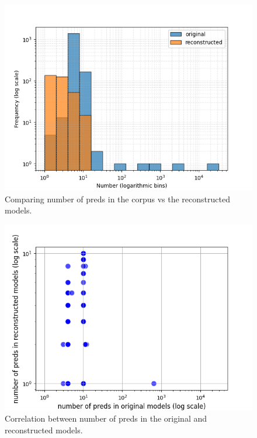 \begin{figure}[htbp]
\centerline{\includegraphics[width=\linewidth]{"./Comparing number of preds in the corpus vs the reconstructed models.png"}}
\caption{Comparing number of preds in the corpus vs the reconstructed models.}
\label{fig}
\end{figure}


\begin{figure}[htbp]
\centerline{\includegraphics[width=\linewidth]{"./Correlation between number of preds in the original and reconstructed models.png"}}
\caption{Correlation between number of preds in the original and reconstructed models.}
\label{fig}
\end{figure}
